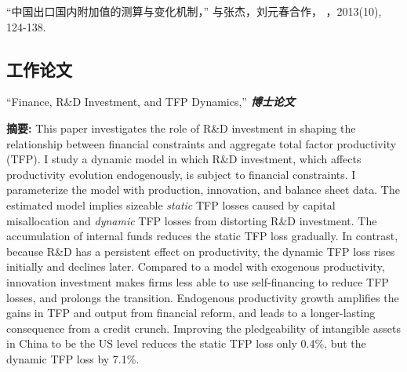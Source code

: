 \documentclass[letterpaper]{article}
\begin{document}
{\vspace{0.5em}
“中国出口国内附加值的测算与变化机制，” 与张杰，刘元春合作， {}，2013(10), 124-138.

\subsection*{\bf{工作论文}}
“Finance, R\&D Investment, and TFP Dynamics,” \textbf{\textit{博士论文}}
 \vspace{0.05in}
 \begin{center}
 \begin{minipage}{0.9\linewidth}
   \textbf{摘要:} This paper investigates the role of R\&D investment in shaping the relationship between financial constraints and aggregate total factor productivity (TFP). I study a dynamic model in which R\&D investment, which affects productivity evolution endogenously, is subject to financial constraints. I parameterize the model with production, innovation, and balance sheet data. The estimated model implies sizeable \textit{static} TFP losses caused by capital misallocation and \textit{dynamic} TFP losses from distorting R\&D investment. The accumulation of internal funds reduces the static TFP loss gradually. In contrast, because R\&D has a persistent effect on productivity, the dynamic TFP loss rises initially and declines later. Compared to a model with exogenous productivity, innovation investment makes firms less able to use self-financing to reduce TFP losses, and prolongs the transition. Endogenous productivity growth amplifies the gains in TFP and output from financial reform, and leads to a longer-lasting consequence from a credit crunch. Improving the pledgeability of intangible assets in China to be the US level reduces the static TFP loss only 0.4\%, but the dynamic TFP loss by 7.1\%.
 \end{minipage}
 \end{center}
 \vspace{0.05in}

}
\end{document}
